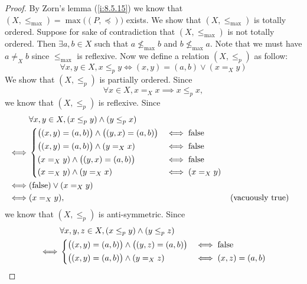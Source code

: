 \begin{proof}
  By Zorn's lemma (\cref{i:8.5.15}) we know that \((X, \leq_{\max}) = \max\big((P, \preceq)\big)\) exists.
  We show that \((X, \leq_{\max})\) is totally ordered.
  Suppose for sake of contradiction that \((X, \leq_{\max})\) is not totally ordered.
  Then \(\exists a, b \in X\) such that \(a \not\leq_{\max} b\) and \(b \not\leq_{\max} a\).
  Note that we must have \(a \neq_X b\) since \(\leq_{\max}\) is reflexive.
  Now we define a relation \((X, \leq_p)\) as follow:
  \[
    \forall x, y \in X, x \leq_p y \iff (x, y) = (a, b) \lor (x =_X y)
  \]
  We show that \((X, \leq_p)\) is partially ordered.
  Since
  \[
    \forall x \in X, x =_X x \implies x \leq_p x,
  \]
  we know that \((X, \leq_p)\) is reflexive.
  Since
  \begin{align*}
         & \forall x, y \in X, (x \leq_p y) \land (y \leq_p x)                                                           \\
    \iff & \begin{dcases}
             \big((x, y) = (a, b)\big) \land \big((y, x) = (a, b)\big) & \iff \text{false} \\
             \big((x, y) = (a, b)\big) \land (y =_X x)                 & \iff \text{false} \\
             (x =_X y) \land \big((y, x) = (a, b)\big)                 & \iff \text{false} \\
             (x =_X y) \land (y =_X x)                                 & \iff (x =_X y)
           \end{dcases}                                 \\
    \iff & (\text{false}) \lor (x =_X y)                                                                                 \\
    \iff & (x =_X y),                                                                       &  & \text{(vacuously true)}
  \end{align*}
  we know that \((X, \leq_p)\) is anti-symmetric.
  Since
  \begin{align*}
         & \forall x, y, z \in X, (x \leq_p y) \land (y \leq_p z)                                                           \\
    \iff & \begin{dcases}
             \big((x, y) = (a, b)\big) \land \big((y, z) = (a, b)\big) & \iff \text{false}    \\
             \big((x, y) = (a, b)\big) \land (y =_X z)                 & \iff (x, z) = (a, b) \\

\end{dcases}
\end{align*}
\end{proof}
